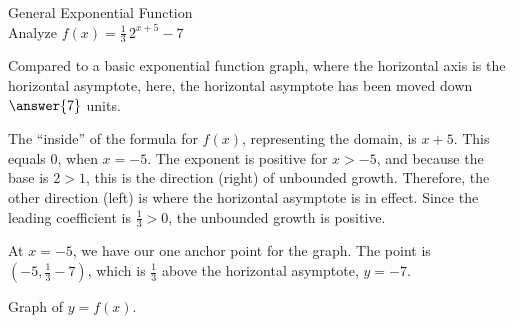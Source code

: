 \documentclass{ximera}
\begin{document}
\begin{example}  General Exponential Function \\



Analyze   $f(x) = \frac{1}{3} \, 2^{x+5} - 7$ \\


\begin{explanation}

Compared to a basic exponential function graph, where the horizontal axis is the horizontal asymptote, here, the horizontal asymptote has been moved down $\answer{7}$ units.



The ``inside'' of the formula for $f(x)$, representing the domain, is $x+5$.  This equals $0$, when $x=-5$.  The exponent is positive for $x>-5$, and because the base is $2 > 1$, this is the direction (right) of unbounded growth.  Therefore, the other direction (left) is where the horizontal asymptote is in effect.  Since the leading coefficient is $\frac{1}{3} > 0$, the unbounded growth is positive.

At $x=-5$, we have our one anchor point for the graph.  The point is $\left(-5, \frac{1}{3} - 7 \right)$, which is $\frac{1}{3}$ above the horizontal asymptote, $y = -7$.


Graph of $y = f(x)$.

\begin{image}
\end{image}
\end{explanation}
\end{example}
\end{document}
